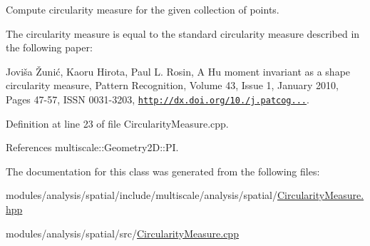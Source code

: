 Compute circularity measure for the given collection of points. 

The circularity measure is equal to the standard circularity measure described in the following paper\-:

Joviša Žunić, Kaoru Hirota, Paul L. Rosin, A Hu moment invariant as a shape circularity measure, Pattern Recognition, Volume 43, Issue 1, January 2010, Pages 47-\/57, I\-S\-S\-N 0031-\/3203, \href{http://dx.doi.org/10.1016/j.patcog.2009.06.017}{\tt http\-://dx.\-doi.\-org/10./j.\-patcog...}. 

Definition at line 23 of file Circularity\-Measure.\-cpp.



References multiscale\-::\-Geometry2\-D\-::\-P\-I.



The documentation for this class was generated from the following files\-:\begin{DoxyCompactItemize}
\item 
modules/analysis/spatial/include/multiscale/analysis/spatial/\hyperlink{CircularityMeasure_8hpp}{Circularity\-Measure.\-hpp}\item 
modules/analysis/spatial/src/\hyperlink{CircularityMeasure_8cpp}{Circularity\-Measure.\-cpp}\end{DoxyCompactItemize}

